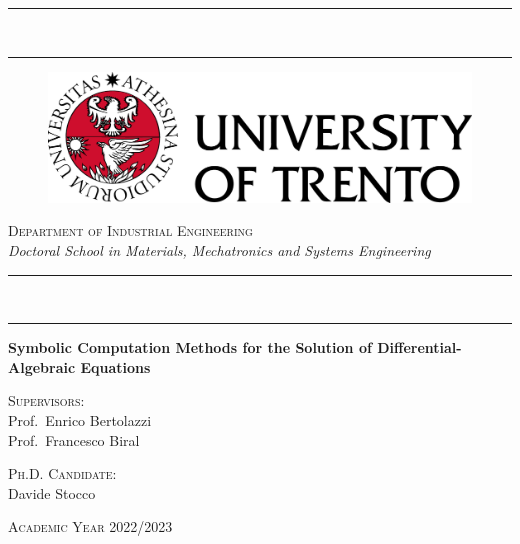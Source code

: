 
\begin{titlepage}
%
\setlength\parindent{0pt}
\setlength{\topmargin}{-20mm}
\setlength{\voffset}{0mm}
%
\begin{center}
  \rule[0.1cm]{\textwidth}{0.6mm} \\ %
  \rule[0.5cm]{\textwidth}{0.3mm}
\end{center}
%
\vspace{-5mm}
%
\begin{figure}[h]
  \centering
  \includegraphics[scale=0.5]{./figures/frontmatter/logo.png}
\end{figure}
%
\begin{center}
  \Large{\textsc{Department of Industrial Engineering}} \\
  \vspace{2mm}
  \large{\textsl{Doctoral School in Materials, Mechatronics and Systems Engineering}} \\
\end{center}
%
\begin{center}
  \rule[0.1cm]{\textwidth}{0.3mm} \\ %
  \rule[0.5cm]{\textwidth}{0.6mm}
\end{center}
%
\vfill
%
\begin{center}
  \LARGE{\textbf{Symbolic Computation Methods for the Solution of Differential-Algebraic Equations}} \\
\end{center}
%
\vfill
%
\begin{minipage}[t]{0.49\textwidth}
  \large{\textsc{Supervisors:}} \\
  Prof.~Enrico Bertolazzi \\[0.05em]
  Prof.~Francesco Biral
\end{minipage}
\hfill
\begin{minipage}[t]{0.49\textwidth}\raggedleft
  \large{\textsc{Ph.D. Candidate:}} \\
  Davide Stocco
  \vspace{5mm}
\end{minipage}
%
\vfill
%
\begin{center}
  \large{\textsc{Academic Year 2022/2023}}
\end{center}

\end{titlepage}